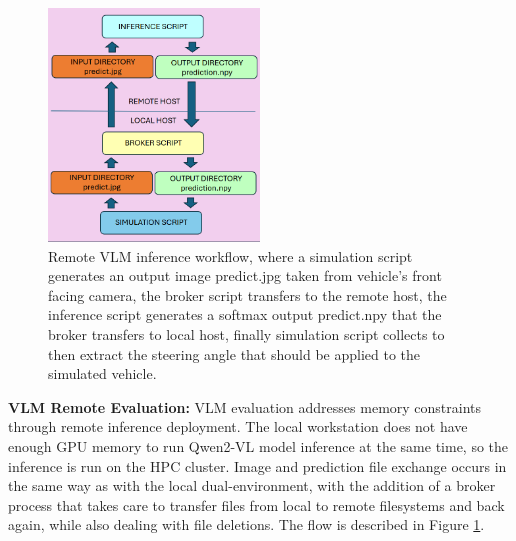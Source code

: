 \begin{figure}[h]
\centering
\includegraphics[width=0.50\textwidth]{Figures/Methods/RemoteVLMInference.png}
\caption{Remote VLM inference workflow, where a simulation script generates an output image predict.jpg taken from vehicle's front facing camera, the broker script transfers to the remote host, the inference script generates a softmax output predict.npy that the broker transfers to local host, finally simulation script collects to then extract the steering angle that should be applied to the simulated vehicle.}
\label{fig:RemoteVLMInference}
\end{figure}



\textbf{VLM Remote Evaluation:} VLM evaluation addresses memory constraints through remote inference deployment. The local workstation does not have enough GPU memory to run Qwen2-VL model inference at the same time, so the inference is run on the HPC cluster. Image and prediction file exchange occurs in the same way as with the local dual-environment, with the addition of a broker process that takes care to transfer files from local to remote filesystems and back again, while also dealing with file deletions. The flow is described in Figure \ref{fig:RemoteVLMInference}. 

